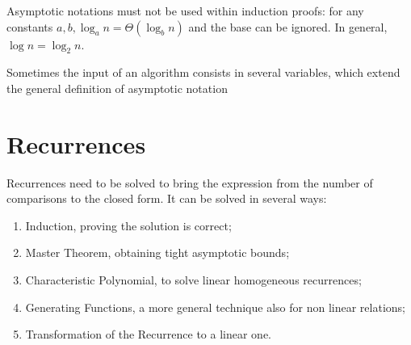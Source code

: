 Asymptotic notations must not be used within induction proofs: for any constants $a, b, \log_a n = \Theta(\log_b n)$ and the base can be ignored. In general, $\log n = \log_2 n$.

Sometimes the input of an algorithm consists in several variables, which extend the general definition of asymptotic notation

\section{Recurrences}
Recurrences need to be solved to bring the expression from the number of comparisons to the closed form. It can be solved in several ways:
\begin{enumerate}
	\item Induction, proving the solution is correct;
	\item Master Theorem, obtaining tight asymptotic bounds;
	\item Characteristic Polynomial, to solve linear homogeneous recurrences;
	\item Generating Functions, a more general technique also for non linear relations;
	\item Transformation of the Recurrence to a linear one.
\end{enumerate}






